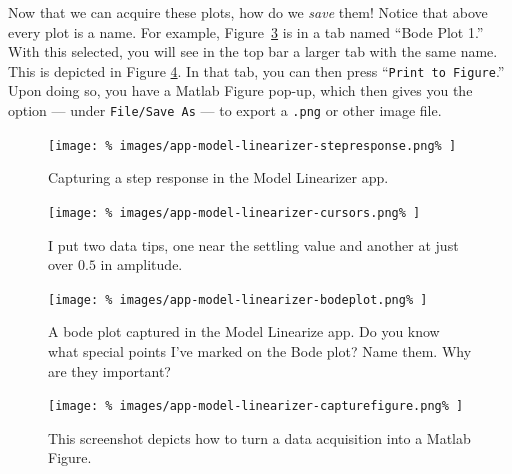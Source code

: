 Now that we can acquire these plots, how do we \emph{save} them! Notice that
above every plot is a name. For example, Figure~\ref{fig:app1:bodeplot} is
in a tab named ``Bode Plot 1.'' With this selected, you will see in the top
bar a larger tab with the same name. This is depicted in Figure
\ref{fig:app1:capturefigure}. In that tab, you can then press
``\texttt{Print to Figure}.'' Upon doing so, you have a Matlab Figure pop-up,
which then gives you the option --- under \texttt{File/Save As} --- to
export a \texttt{.png} or other image file.
%
\begin{figure}
  \centering
  \texttt{[image: \%
    images/app-model-linearizer-stepresponse.png\%
  ]}
  \caption[Capturing a Step Response in the Model Linearizer App]{%
    Capturing a step response in the Model Linearizer app.
  }
  \label{fig:app1:stepresponse}
\end{figure}
%
\begin{figure}
  \centering
  \texttt{[image: \%
    images/app-model-linearizer-cursors.png\%
  ]}
  \caption[Data Tips in Matlab Figures]{%
    I put two data tips, one near the settling value and another at
    just over \(0.5\) in amplitude.
  }
  \label{fig:app1:cursors}
\end{figure}
%
\begin{figure}
  \centering
  \texttt{[image: \%
    images/app-model-linearizer-bodeplot.png\%
  ]}
  \caption[Bode Plot captured in the Model Linearizer App]{%
    A bode plot captured in the Model Linearize app. Do you know what special
    points I've marked on the Bode plot? Name them. Why are they important?
  }
  \label{fig:app1:bodeplot}
\end{figure}
%
\begin{figure}
  \centering
  \texttt{[image: \%
    images/app-model-linearizer-capturefigure.png\%
  ]}
  \caption[Acquiring a Figure in the Model Linearizer App]{%
    This screenshot depicts how to turn a data acquisition into a Matlab
    Figure.
  }
  \label{fig:app1:capturefigure}
\end{figure}
%
